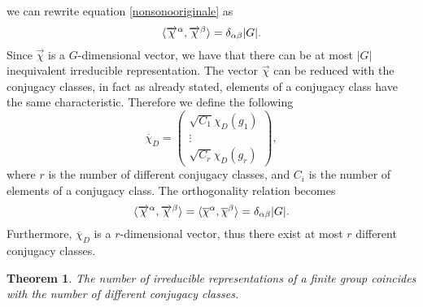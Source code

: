 \documentclass[12pt]{book}
\theoremstyle{plain}
\newtheorem{thm}{Theorem}[section]
\theoremstyle{definition}
\theoremstyle{remark}
\begin{document}
we can rewrite equation \eqref{nonsonooriginale} as
\[\braket{\overrightarrow{\chi}^\alpha ,\overrightarrow{\chi}^\beta} = \delta_{\alpha\beta}|G|.\]
Since $\overrightarrow{\chi}$ is a $G$-dimensional vector, we have that there can be at most $|G|$ inequivalent irreducible representation. The vector $\overrightarrow{\chi}$ can be reduced with the conjugacy classes, in fact as already stated, elements of a conjugacy class have the same characteristic. Therefore we define the following
\[\overline{\chi}_D = \begin{pmatrix} \sqrt{C_1} \chi_D(g_1) \\ \vdots \\ \sqrt{C_r} \chi_D(g_r)
\end{pmatrix},\]
where $r$ is the number of different conjugacy classes, and $C_i$ is the number of elements of a conjugacy class. The orthogonality relation becomes
\[\braket{\overrightarrow{\chi}^\alpha ,\overrightarrow{\chi}^\beta} = \braket{\overline{\chi}^\alpha,\overline{\chi}^\beta} = \delta_{\alpha\beta}|G|.\]
Furthermore, $\overline{\chi}_D$ is a $r$-dimensional vector, thus there exist at most $r$ different conjugacy classes. 
\begin{thm}
The number of irreducible representations of a finite group coincides with the number of different conjugacy classes.
\end{thm}
\end{document}
